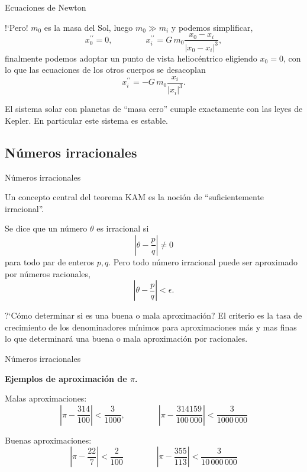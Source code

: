 \documentclass[8pt]{beamer}
\renewcommand{\>}{\rangle}
\newcommand{\<}{\langle}
\newcommand{\be}{\begin{equation}}
\newcommand{\ee}{\end{equation}}
\begin{document}
\begin{frame}{Ecuaciones de Newton}
\vspace{-1cm}

!`Pero! $m_{0}$ es la masa del Sol, luego $m_{0} \gg m_{i}$ y podemos simplificar,
\be 
	x_{0}^{\prime \prime} = 0, \qquad \qquad x_{i}^{\prime \prime} =  G\, m_{0} \frac{x_{0}-x_{i}}{|x_{0}-x_{i}|^{3}}, \nonumber 
\ee
finalmente podemos adoptar un punto de vista heliocéntrico eligiendo $x_{0}=0$, con lo que las ecuaciones de los otros cuerpos se desacoplan
\be 
	x_{i}^{\prime \prime} =  -G\, m_{0} \frac{x_{i}}{|x_{i}|^{3}}.
	\nonumber
\ee

El sistema solar con planetas de ``masa cero'' cumple exactamente con las leyes de Kepler.
En particular este sistema es estable.

\end{frame}

\subsection[Números irracionales]{Números irracionales}

\begin{frame}{Números irracionales}

\begin{mybluebox}{}
Un concepto central del teorema KAM es la noción de ``suficientemente irracional''.
\end{mybluebox}

Se dice que un número $\theta$ es irracional si $$\left|\theta - \frac{p}{q} \right| \neq 0$$ para todo par de enteros $p, q$.
Pero todo número irracional puede ser aproximado por números racionales,
\be 
	\left|\theta - \frac{p}{q} \right| < \epsilon . \nonumber
\ee

\vspace{0.5cm}

\begin{mybox}{?`Cómo determinar si es una buena o mala aproximación?}
El criterio es la tasa de crecimiento de los denominadores mínimos para aproximaciones más y mas finas lo que determinará una buena o mala aproximación por racionales.
\end{mybox}
\end{frame}

\begin{frame}{Números irracionales}
\vspace{-1cm}

{\bf Ejemplos de aproximación de $\pi$.}
\bigskip

Malas aproximaciones:\\
\be 
	\left|\pi - \frac{314}{100} \right| < \frac{3}{1000}, 
	\qquad \qquad 
	\left|\pi - \frac{314159}{100\, 000} \right| < \frac{3}{1000\, 000}
	\nonumber
\ee
\vspace{0.5cm}

Buenas aproximaciones:\\
\be 
	\left|\pi - \frac{22}{7} \right| < \frac{2}{100}
	\qquad \qquad
	\left|\pi - \frac{355}{113} \right| < \frac{3}{10\, 000\, 000}
	\nonumber
\ee

\end{frame}
\end{document}
